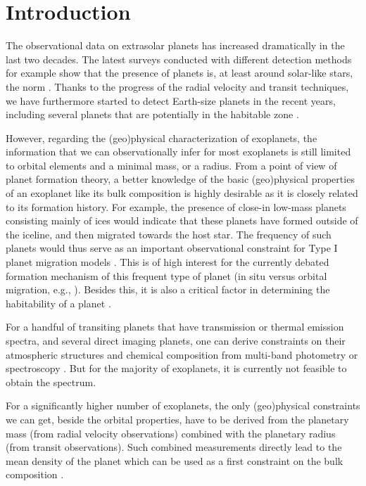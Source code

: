 \documentclass[]{emulateapj}
\begin{document}


\section{Introduction}
The observational data on extrasolar planets has increased dramatically in the last two decades. The latest surveys conducted with different detection methods for example show that the presence of planets  is, at least around solar-like stars, the norm \citep{Mayor2011,Borucki2011,Cassan2012}. Thanks to the progress of the radial velocity and transit techniques, we have furthermore started to detect Earth-size planets in the recent years, including several planets that are potentially in the habitable zone \citep[see][]{Kopparapu2013}.

However, regarding the (geo)physical characterization of exoplanets, the information that we can observationally infer for most exoplanets is still limited to orbital elements and a minimal mass, or a radius. From a point of view of planet formation theory, a better knowledge of the basic (geo)physical properties of an exoplanet like its bulk composition is highly desirable as it is closely related to its formation history. For example, the presence of close-in low-mass planets consisting mainly of ices would indicate that these planets have formed outside of the iceline, and then migrated towards the host star. The frequency of such planets would thus serve as an important observational constraint for Type I planet migration models \citep[e.g.,][]{paardekooperbaruteau2010,dittkristmordasini2014}. This is of high interest for the currently debated formation mechanism of this frequent type of planet (in situ versus orbital migration, e.g., \citealt{chianglaughlin2013,ogiharamorbidelli2015}).  Besides this, it is also a critical factor in determining the habitability of a planet \citep[e.g.][]{Alibert2014,kitzmann2015}.

For a handful of transiting planets that have transmission or thermal emission spectra, and several direct imaging planets, one can derive constraints on their atmospheric structures and chemical composition from multi-band photometry or spectroscopy \citep[e.g.,][]{Richardson2007,Madhusudhan2011GJ436b,Konopacky2013}. But for the majority of exoplanets, it is currently not feasible to obtain the spectrum.

For a significantly higher number of exoplanets, the only (geo)physical constraints we can get, beside the orbital properties, have to be derived from the  planetary mass (from radial velocity observations) combined with the planetary radius (from transit observations). Such combined measurements directly lead to the mean density of the planet which can be used as a first constraint on the bulk composition \citep[e.g.,][]{Valencia2007,Valencia2010,Rogers2010GJ1214b,Rogers2010density}.
\end{document}

